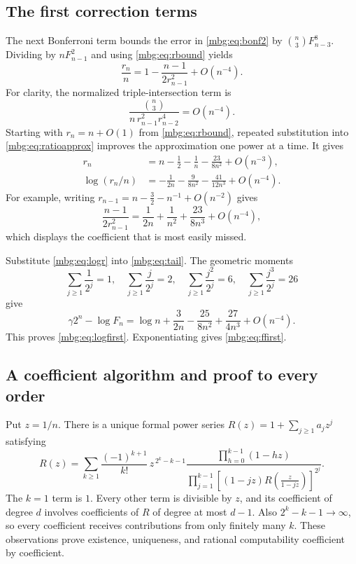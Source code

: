 \documentclass[11pt,letterpaper]{article}
\theoremstyle{definition}
\begin{document}
\subsection{The first correction terms}
The next Bonferroni term bounds the error in \eqref{mbg:eq:bonf2} by $\binom n3F_{n-3}^8$. Dividing by $nF_{n-1}^2$ and using \eqref{mbg:eq:rbound} yields
\begin{equation}
 \frac{r_n}{n}=1-\frac{n-1}{2r_{n-1}^2}+O(n^{-4}).
 \label{mbg:eq:ratioapprox}
\end{equation}
For clarity, the normalized triple-intersection term is
\[
 \frac{\binom n3}{n\,r_{n-1}^2r_{n-2}^4}=O(n^{-4}).
\]
Starting with $r_n=n+O(1)$ from \eqref{mbg:eq:rbound}, repeated substitution into \eqref{mbg:eq:ratioapprox} improves the approximation one power at a time. It gives
\begin{align}
 r_n&=n-\frac12-\frac1n-\frac{23}{8n^2}+O(n^{-3}),
 \label{mbg:eq:rfirst}\\
 \log(r_n/n)&=-\frac1{2n}-\frac9{8n^2}-\frac{41}{12n^3}
                     +O(n^{-4}).
 \label{mbg:eq:logr}
\end{align}
For example, writing $r_{n-1}=n-\tfrac32-n^{-1}+O(n^{-2})$ gives
\[
 \frac{n-1}{2r_{n-1}^2}
 =\frac1{2n}+\frac1{n^2}+\frac{23}{8n^3}+O(n^{-4}),
\]
which displays the coefficient that is most easily missed.

Substitute \eqref{mbg:eq:logr} into \eqref{mbg:eq:tail}. The geometric moments
\[
 \sum_{j\ge1}\frac1{2^j}=1,\quad
 \sum_{j\ge1}\frac j{2^j}=2,\quad
 \sum_{j\ge1}\frac {j^2}{2^j}=6,\quad
 \sum_{j\ge1}\frac {j^3}{2^j}=26
\]
give
\[
 \gamma2^n-\log F_n
   =\log n+\frac{3}{2n}-\frac{25}{8n^2}
                          +\frac{27}{4n^3}+O(n^{-4}).
\]
This proves \eqref{mbg:eq:logfirst}. Exponentiating gives \eqref{mbg:eq:ffirst}.

\subsection{A coefficient algorithm and proof to every order}
Put $z=1/n$. There is a unique formal power series
$R(z)=1+\sum_{j\ge1}a_jz^j$ satisfying
\begin{equation}
 R(z)=\sum_{k\ge1}\frac{(-1)^{k+1}}{k!}\,
 z^{\,2^k-k-1}
 \frac{\displaystyle\prod_{h=0}^{k-1}(1-hz)}
 {\displaystyle\prod_{j=1}^{k-1}
   \left[(1-jz)R\left(\frac{z}{1-jz}\right)\right]^{2^j}}.
 \label{mbg:eq:Rformal}
\end{equation}
The $k=1$ term is $1$. Every other term is divisible by $z$, and its coefficient of degree $d$ involves coefficients of $R$ of degree at most $d-1$. Also $2^k-k-1\to\infty$, so every coefficient receives contributions from only finitely many $k$. These observations prove existence, uniqueness, and rational computability coefficient by coefficient.
\end{document}
